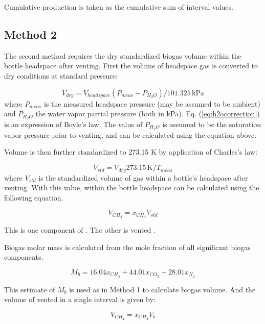 \documentclass[]{article}
\newcommand{\unit}[1]{\ensuremath{\, \mathrm{#1}}}
\begin{document}
Cumulative production is taken as the cumulative sum of interval values. 

\subsection{Method 2}
The second method requires the dry standardized biogas volume within the bottle headspace after venting.
First the volume of headspace gas is converted to dry conditions at standard pressure:

\begin{equation}
  \label{eq:h2ocorrection}
  V_{dry} = V_{headspace}(P_{meas} - P_{H_2O})/101.325 \unit{kPa}
\end{equation}
where $P_{meas}$ is the measured headspace pressure (may be assumed to be ambient) and $P_{H_2O}$ the water vapor partial pressure (both in kPa).
Eq. (\ref{eq:h2ocorrection}) is an expression of Boyle's law.
The value of $P_{H_2O}$ is assumed to be the saturation vapor pressure prior to venting, and can be calculated using the equation above.

Volume is then further standardized to 273.15 K by application of Charles's law:

\begin{equation}
  \label{eq:bgstd}
  V_{std} = V_{dry} 273.15 \unit{K}/T_{meas}
\end{equation}
where $V_{std}$ is the standardized volume of gas within a bottle's headspace after venting.
With this value,  within the bottle headspace can be calculated using the following equation.

\begin{equation}
  V_{CH_4} = x_{CH_4} V_{std}
\end{equation}

This is one component of .
The other is vented .

Biogas molar mass is calculated from the mole fraction of all significant biogas components.

\begin{equation}
  M_b = 16.04 x_{CH_4} + 44.01 x_{CO_2} + 28.01 x_{N_2}
\end{equation}

This estimate of $M_b$ is used as in Method 1 to calculate biogas volume.
And the volume of vented  in a single interval is given by:

\begin{equation}
  \label{eq:ch4m1}
  V_{CH_4} = x_{CH_4} V_b
\end{equation}
\end{document}

